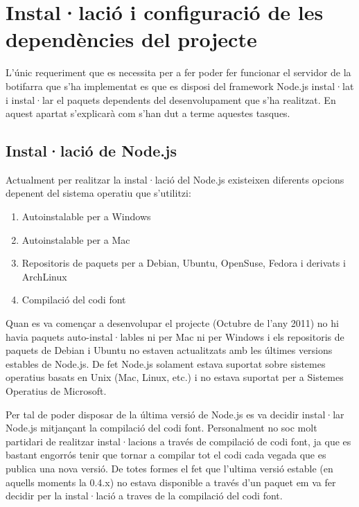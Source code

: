 \chapter{Instal·lació i configuració de les dependències del projecte}
\label{chap:dependencies}


L'únic requeriment que es necessita per a fer poder fer funcionar el servidor de la botifarra que s'ha implementat es que es disposi del framework Node.js instal·lat i instal·lar el paquets dependents del desenvolupament que s'ha realitzat. En aquest apartat s'explicarà com s'han dut a terme aquestes tasques. 

\section{Instal·lació de Node.js}
\label{sec:instalacio-Node.js}
Actualment per realitzar la instal·lació del Node.js existeixen diferents opcions depenent del sistema operatiu que s'utilitzi: 

\begin{enumerate}
    \item{Autoinstalable per a Windows}
    \item{Autoinstalable per a Mac}
    \item{Repositoris de paquets per a Debian, Ubuntu, OpenSuse, Fedora i derivats i ArchLinux}
    \item{Compilació del codi font}
\end{enumerate}

Quan es va començar a desenvolupar el projecte (Octubre de l'any 2011) no hi havia paquets auto-instal·lables ni per Mac ni per Windows i els repositoris de paquets de Debian i Ubuntu no estaven actualitzats amb les últimes versions estables de Node.js. De fet Node.js solament estava suportat sobre sistemes operatius basats en Unix (Mac, Linux, etc.) i no estava suportat per a Sistemes Operatius de Microsoft. 

Per tal de poder disposar de la última versió de Node.js es va decidir instal·lar Node.js mitjançant la compilació del codi font. Personalment no soc molt partidari de realitzar instal·lacions a través de compilació de codi font, ja que es bastant engorrós tenir que tornar a compilar tot el codi cada vegada que es publica una nova versió. De totes formes el fet que l'ultima versió estable (en aquells moments la 0.4.x) no estava disponible a través d'un paquet em va fer decidir per la instal·lació a traves de la compilació del codi font. 

